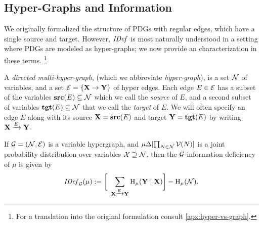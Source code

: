 \documentclass[subfiles]{the-pdg-manual.tex}
\begin{document}
\subsection{Hyper-Graphs and Information}
We originally formalized the structure of PDGs with regular edges, which have a single source and target. However, $\mathit{IDef}_{}$ is most naturally understood in a setting where PDGs are modeled as hyper-graphs; we now provide an characterization in these terms.%
	\footnote{For a translation into the original formulation consult \cref{apx:hyper-vs-graph}.}
\begin{defn} \label{defn:hypergraph}
	A \emph{directed multi-hyper-graph}, (which we abbreviate \emph{hyper-graph}), is a set $\mathcal N$ of variables, and a set $\mathcal E = \{ \mathbf X \to \mathbf Y \}$ of hyper edges. Each edge $E \in \mathcal E$ has a subset of the variables $\operatorname{\mathbf{src}}(E) \subseteq \mathcal N$ which we call the \emph{source} of $E$, and a second subset of variables $\operatorname{\mathbf{tgt}}(E) \subseteq \mathcal N$ that we call the \emph{target} of $E$. We will often specify an edge $E$ along with its source $\mathbf X = \operatorname{\mathbf{src}}(E)$ and target $\mathbf Y = \operatorname{\mathbf{tgt}}(E)$ by writing $\ed E{\mat X}{\mat Y}$.
\end{defn}

\begin{defn} \label{defn:idef}
	If $\mathcal G = (\mathcal N, \mathcal E)$ is a variable hypergraph, and $\mu {\Delta [ \prod_{N\in\mathcal N}\mathcal V(N)]}$ is a joint probability distribution over variables $\mathcal X \supseteq \mathcal N$, then the $\mathcal G$-information deficiency of $\mu$ is given by
	\begin{equation}
		\IDef{\Gr}(\mu) := \bigg[~\sum_{\ed E{\mat X}{\mat Y}} \H_\mu(\mat Y\mid \mat X)\bigg] - \H_\mu(\N).
		\label{eq:idef}
	\end{equation}
\end{defn}

\end{document}
